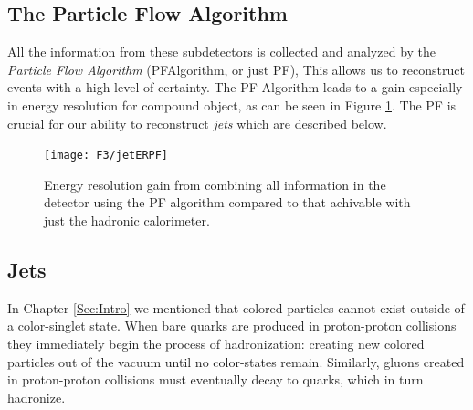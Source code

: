 \subsection{The Particle Flow Algorithm}
All the information from these subdetectors is collected and analyzed by the \textit{Particle Flow Algorithm} (PFAlgorithm, or just PF)\cite{CMS-PAS-PFT-09-001}, This allows us to reconstruct events with a high level of certainty. The PF Algorithm leads to a gain especially in energy resolution for compound object, as can be seen in Figure \ref{Fig:CMS:PFyay}. The PF is crucial for our ability to reconstruct \textit{jets} which are described below.
\begin{figure}[h!]
    \centering
        \texttt{[image: F3/jetERPF]}
        \caption{Energy resolution gain from combining all information in the detector using the PF algorithm compared to that achivable with just the hadronic calorimeter.}
        \label{Fig:CMS:PFyay}
\end{figure}
\subsection{Jets}
In Chapter \ref{Sec:Intro} we mentioned that colored particles cannot exist outside of a color-singlet state. When bare quarks are produced in proton-proton collisions they immediately begin the process of hadronization: creating new colored particles out of the vacuum until no color-states remain. Similarly, gluons created in proton-proton collisions must eventually decay to quarks, which in turn hadronize.

